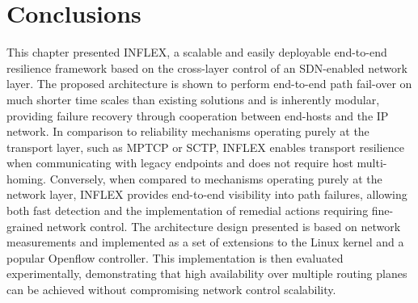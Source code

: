 \section{Conclusions}
\label{section:conc}

This chapter presented INFLEX, a scalable and easily deployable end-to-end resilience framework based on the cross-layer control of an \ac{SDN}-enabled network layer.
The proposed architecture is shown to perform end-to-end path fail-over on much shorter time scales than existing solutions and is inherently modular, providing failure recovery through cooperation between end-hosts and the \ac{IP} network. 
In comparison to reliability mechanisms operating purely at the transport layer, such as \ac{MPTCP} or \ac{SCTP}, INFLEX enables transport resilience when communicating with legacy endpoints and does not require host multi-homing. 
Conversely, when compared to mechanisms operating purely at the network layer, INFLEX provides end-to-end visibility into path failures, allowing both fast detection and the implementation of remedial actions requiring fine-grained network control. 
The architecture  design presented is based on network measurements and implemented as a set of extensions to the Linux kernel and a popular Openflow controller. 
This implementation is then evaluated experimentally, demonstrating that high availability over multiple routing planes can be achieved without compromising network control scalability.


